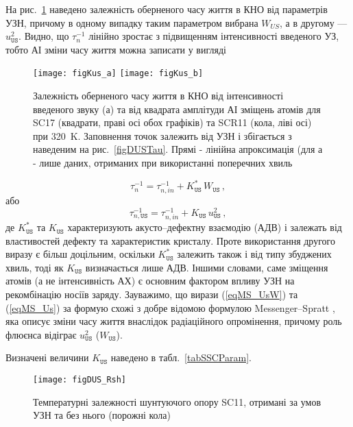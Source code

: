На рис.~\ref{figKus} наведено залежність оберненого часу життя в КНО від параметрів УЗН,
причому в одному випадку таким параметром вибрана $W_{U\!S}$, а в другому ---$u_\mathtt{US}^2$.
Видно, що $\tau_n^{-1}$ лінійно зростає з підвищенням інтенсивності введеного УЗ,
тобто АІ зміни часу життя можна записати у вигляді

\begin{figure}
\center
\texttt{[image: figKus\_a]} \hfill
\texttt{[image: figKus\_b]}
\caption{\label{figKus}
Залежність оберненого часу життя в КНО від інтенсивності введеного звуку (а)
та від квадрата амплітуди АІ зміщень атомів для SC17 (квадрати, праві осі обох графіків)
та SCR11 (кола, ліві осі) при 320~K.
Заповнення точок залежить від УЗН і збігається з наведеним на рис.~\ref{figDUSTau}.
Прямі - лінійна апроксимація (для а - лише даних, отриманих при використанні поперечних хвиль
}%
\end{figure}

\begin{equation}
\label{eqMS_UsW}
\tau_n^{-1}=\tau_{n,in}^{-1}+K_\mathtt{US}^{*}\,W_\mathtt{US}\,,
\end{equation}
або
\begin{equation}
\label{eqMS_Us}
\tau_{n,\mathtt{US}}^{-1}=\tau_{n,in}^{-1}+K_\mathtt{US}\,u_\mathtt{US}^2 \,,
\end{equation}
де $K_\mathtt{US}^{*}$ та $K_\mathtt{US}$ характеризують акусто--дефектну взаємодію (АДВ) і залежать від властивостей дефекту та характеристик кристалу.
Проте використання  другого виразу є більш доцільним, оскільки $K_\mathtt{US}^{*}$ залежить також і від типу збуджених хвиль,
тоді як $K_\mathtt{US}$ визначається лише АДВ.
Іншими словами, саме зміщення атомів (а не інтенсивність АХ) є основним фактором впливу УЗН на рекомбінацію носіїв заряду.
Зауважимо, що вирази (\ref{eqMS_UsW}) та (\ref{eqMS_Us}) за формую схожі з добре відомою формулою Messenger--Spratt \cite{Markvart},
яка описує зміни часу життя внаслідок радіаційного опромінення, причому роль флюєнса відіграє $u_\mathtt{US}^2$ ($W_\mathtt{US}$).

Визначені величини $K_\mathtt{US}$ наведено в табл.~\ref{tabSSCParam}.

\begin{figure}
\center
\texttt{[image: figDUS\_Rsh]}%
\caption{\label{figDUS_Rsh}
Температурні залежності шунтуючого опору SC11, отримані за умов УЗН та без нього (порожні кола)
}%
\end{figure}

